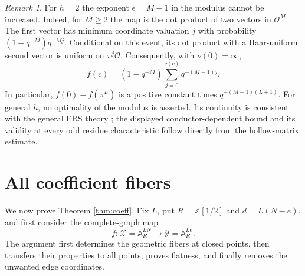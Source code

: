 \documentclass[11pt]{article}
\numberwithin{equation}{section}
\theoremstyle{remark}
\newtheorem{remark}[theorem]{Remark}
\newcommand{\A}{\mathbb A}
\newcommand{\Z}{\mathbb Z}
\begin{document}
\begin{remark}
For $h=2$ the exponent $\epsilon=M-1$ in the modulus cannot be
increased. Indeed, for $M\ge2$ the map is the dot product of two
vectors in $\mathcal O^M$. The first vector has minimum coordinate
valuation $j$ with probability $(1-q^{-M})q^{-Mj}$. Conditional on
this event, its dot product with a Haar-uniform second vector is
uniform on $\pi^j\mathcal O$. Consequently, with $\nu(0)=\infty$,
\[
 f(c)=(1-q^{-M})\sum_{j=0}^{\nu(c)}q^{-(M-1)j}.
\]
In particular, $f(0)-f(\pi^L)$ is a positive constant times
$q^{-(M-1)(L+1)}$. For general $h$, no optimality of the modulus
is asserted. Its continuity is consistent with the general FRS
theory \cite{AAfrs}; the displayed conductor-dependent bound and
its validity at every odd residue characteristic follow directly
from the hollow-matrix estimate.
\end{remark}

\section{All coefficient fibers}
We now prove Theorem \ref{thm:coeff}. Fix $L$, put $R=\Z[1/2]$
and $d=L(N-e)$, and first consider the complete-graph map
\[
 f:\mathcal X=\A_R^{LN}\longrightarrow\mathcal Y=\A_R^{Le}.
\]
The argument first determines the geometric fibers at closed points,
then transfers their properties to all points, proves flatness, and
finally removes the unwanted edge coordinates.
\end{document}
